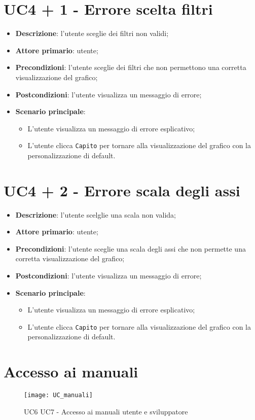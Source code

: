 \section{UC4 + 1 - Errore scelta filtri}
\begin{itemize}
  \item \textbf{Descrizione}: l'utente sceglie dei filtri non validi;
  \item \textbf{Attore primario}: utente;
  \item \textbf{Precondizioni}: l'utente sceglie dei filtri che non permettono una corretta visualizzazione del grafico;
  \item \textbf{Postcondizioni}: l'utente visualizza un messaggio di errore;
  \item \textbf{Scenario principale}: 
    \begin{itemize}
      \item L'utente visualizza un messaggio di errore esplicativo;
      \item L'utente clicca \texttt{Capito} per tornare alla visualizzazione del grafico con la personalizzazione di default.
    \end{itemize}
\end{itemize}

\section{UC4 + 2 - Errore scala degli assi}
\begin{itemize}
  \item \textbf{Descrizione}: l'utente scelglie una scala non valida;
  \item \textbf{Attore primario}: utente;
  \item \textbf{Precondizioni}: l'utente sceglie una scala degli assi che non permette una corretta visualizzazione del grafico;
  \item \textbf{Postcondizioni}: l'utente visualizza un messaggio di errore;
  \item \textbf{Scenario principale}:  
    \begin{itemize}
      \item L'utente visualizza un messaggio di errore esplicativo;
      \item L'utente clicca \texttt{Capito} per tornare alla visualizzazione del grafico con la personalizzazione di default.
    \end{itemize}
\end{itemize}

\section{Accesso ai manuali}
\begin{figure}[h]
  \centering
  \texttt{[image: UC\_manuali]}
  \caption{UC6 UC7 - Accesso ai manuali utente e sviluppatore}
\end{figure}
